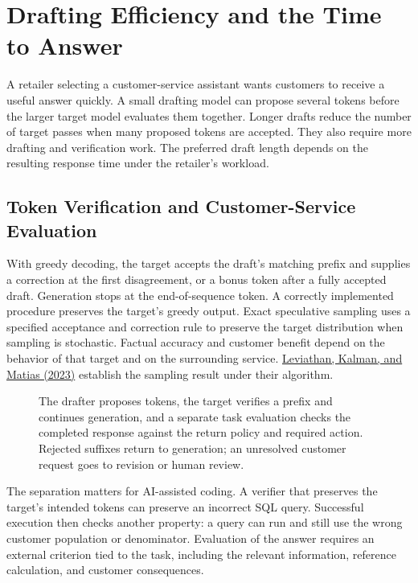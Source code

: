 \hypertarget{M07-drafting-efficiency-and-the-time-to-answer}{%
\section{Drafting Efficiency and the Time to
Answer}\label{M07-drafting-efficiency-and-the-time-to-answer}}

\noindent \noindent A retailer selecting a customer-service assistant wants
customers to receive a useful answer quickly. A small drafting model can
propose several tokens before the larger target model evaluates them
together. Longer drafts reduce the number of target passes when many
proposed tokens are accepted. They also require more drafting and
verification work. The preferred draft length depends on the resulting
response time under the retailer's workload.

\hypertarget{M07-token-verification-and-customer-service-evaluation}{%
\subsection{Token Verification and Customer-Service
Evaluation}\label{M07-token-verification-and-customer-service-evaluation}}

\noindent \noindent With greedy decoding, the target accepts the draft's matching
prefix and supplies a correction at the first disagreement, or a bonus
token after a fully accepted draft. Generation stops at the
end-of-sequence token. A correctly implemented procedure preserves the
target's greedy output. Exact speculative sampling uses a specified
acceptance and correction rule to preserve the target distribution when
sampling is stochastic. Factual accuracy and customer benefit depend on
the behavior of that target and on the surrounding service.
\href{https://proceedings.mlr.press/v202/leviathan23a.html}{Leviathan,
Kalman, and Matias (2023)} establish the sampling result under their
algorithm.

\begin{figure}[htbp]
\centering

\caption{The drafter proposes tokens, the target verifies a prefix and continues generation, and a separate task evaluation checks the completed response against the return policy and required action. Rejected suffixes return to generation; an unresolved customer request goes to revision or human review.}\label{fig:M07_drafting_verification}
\end{figure}

The separation matters for AI-assisted coding. A verifier that preserves
the target's intended tokens can preserve an incorrect SQL query.
Successful execution then checks another property: a query can run and
still use the wrong customer population or denominator. Evaluation of
the answer requires an external criterion tied to the task, including
the relevant information, reference calculation, and customer
consequences.

